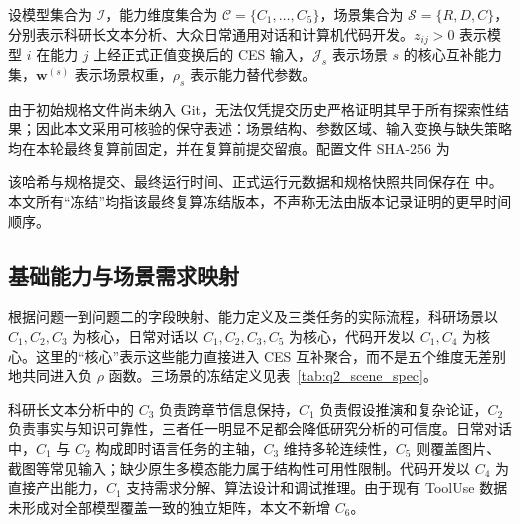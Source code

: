 设模型集合为 $\mathcal I$，能力维度集合为 $\mathcal C=\{C_1,\ldots,C_5\}$，场景集合为 $\mathcal S=\{R,D,C\}$，分别表示科研长文本分析、大众日常通用对话和计算机代码开发。$z_{ij}>0$ 表示模型 $i$ 在能力 $j$ 上经正式正值变换后的 CES 输入，$\mathcal J_s$ 表示场景 $s$ 的核心互补能力集，$\boldsymbol w^{(s)}$ 表示场景权重，$\rho_s$ 表示能力替代参数。

由于初始规格文件尚未纳入 Git，无法仅凭提交历史严格证明其早于所有探索性结果；因此本文采用可核验的保守表述：场景结构、参数区域、输入变换与缺失策略均在本轮最终复算前固定，并在复算前提交留痕。配置文件 SHA-256 为
\begin{center}
\footnotesize\ttfamily\QTwoSpecHash
\end{center}
该哈希与规格提交、最终运行时间、正式运行元数据和规格快照共同保存在  中。本文所有“冻结”均指该最终复算冻结版本，不声称无法由版本记录证明的更早时间顺序。

\subsection{基础能力与场景需求映射}

根据问题一到问题二的字段映射、能力定义及三类任务的实际流程，科研场景以 $C_1,C_2,C_3$ 为核心，日常对话以 $C_1,C_2,C_3,C_5$ 为核心，代码开发以 $C_1,C_4$ 为核心。这里的“核心”表示这些能力直接进入 CES 互补聚合，而不是五个维度无差别地共同进入负 $\rho$ 函数。三场景的冻结定义见表~\ref{tab:q2_scene_spec}。

\begin{table}[htbp]
\centering
\caption{三场景核心能力、KL 约束与参数区域}
\label{tab:q2_scene_spec}
\end{table}

科研长文本分析中的 $C_3$ 负责跨章节信息保持，$C_1$ 负责假设推演和复杂论证，$C_2$ 负责事实与知识可靠性，三者任一明显不足都会降低研究分析的可信度。日常对话中，$C_1$ 与 $C_2$ 构成即时语言任务的主轴，$C_3$ 维持多轮连续性，$C_5$ 则覆盖图片、截图等常见输入；缺少原生多模态能力属于结构性可用性限制。代码开发以 $C_4$ 为直接产出能力，$C_1$ 支持需求分解、算法设计和调试推理。由于现有 ToolUse 数据未形成对全部模型覆盖一致的独立矩阵，本文不新增 $C_6$。

